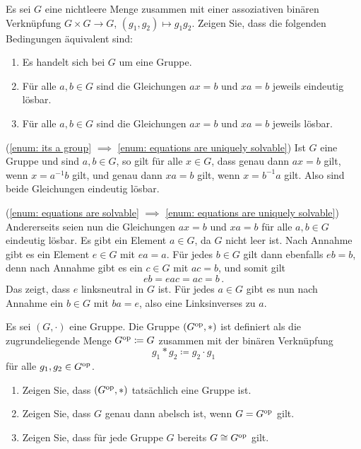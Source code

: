 \begin{question}[subtitle = Zur Definition von Gruppen]
  Es sei $G$ eine nichtleere Menge zusammen mit einer assoziativen binären Verknüpfung $G \times G \to G$, $(g_1, g_2) \mapsto g_1 g_2$.
  Zeigen Sie, dass die folgenden Bedingungen äquivalent sind:
  \begin{enumerate}[label=\roman*)]
    \item
      \label{enum: its a group}
      Es handelt sich bei $G$ um eine Gruppe.
    \item
      \label{enum: equations are uniquely solvable}
      Für alle $a, b \in G$ sind die Gleichungen $ax = b$ und $xa = b$ jeweils eindeutig lösbar.
    \item
      \label{enum: equations are solvable}
      Für alle $a, b \in G$ sind die Gleichungen $ax = b$ und $xa = b$ jeweils lösbar.
  \end{enumerate}
\end{question}


\begin{solution}
  (\ref{enum: its a group} $\implies$ \ref{enum: equations are uniquely solvable})
  Ist $G$ eine Gruppe und sind $a, b \in G$, so gilt für alle $x \in G$, dass genau dann $ax = b$ gilt, wenn $x = a^{-1} b$ gilt, und genau dann $xa = b$ gilt, wenn $x = b^{-1} a$ gilt.
  Also sind beide Gleichungen eindeutig lösbar.
  
  (\ref{enum: equations are solvable} $\implies$ \ref{enum: equations are uniquely solvable})
  Andererseits seien nun die Gleichungen $ax = b$ und $xa = b$ für alle $a, b \in G$ eindeutig lösbar.
  Es gibt ein Element $a \in G$, da $G$ nicht leer ist.
  Nach Annahme gibt es ein Element $e \in G$ mit $ea = a$.
  Für jedes $b \in G$ gilt dann ebenfalls $eb = b$, denn nach Annahme gibt es ein $c \in G$ mit $ac = b$, und somit gilt
  \[
      eb
    = eac
    = ac
    = b\,.
  \]
  Das zeigt, dass $e$ linksneutral in $G$ ist.
  Für jedes $a \in G$ gibt es nun nach Annahme ein $b \in G$ mit $ba = e$, also eine Linksinverses zu $a$.
\end{solution}


\begin{question}[subtitle={Die Gruppe $G^\op$}]
  Es sei $(G,\cdot)$ eine Gruppe.
  Die Gruppe $(G^{\operatorname{op}}, *)$ ist definiert als die zugrundeliegende Menge $G^{\operatorname{op}} \coloneqq G$ zusammen mit der binären Verknüpfung
  \[
              g_1 * g_2
    \coloneqq g_2 \cdot g_1
  \]
  für alle $g_1, g_2 \in G^{\operatorname{op}}$.
  \begin{enumerate}
    \item
      Zeigen Sie, dass $(G^{\operatorname{op}}, *)$ tatsächlich eine Gruppe ist.
    \item
      Zeigen Sie, dass $G$ genau dann abelsch ist, wenn $G = G^{\operatorname{op}}$ gilt.
    \item
      Zeigen Sie, dass für jede Gruppe $G$ bereits $G \cong G^{\operatorname{op}}$ gilt.
  \end{enumerate}
\end{question}


